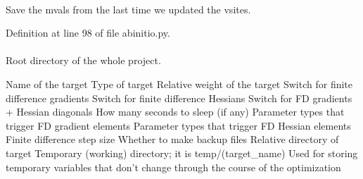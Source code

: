 \hypertarget{classforcebalance_1_1abinitio_1_1AbInitio_a430661954fff8c1979eb9ac28523bb5e}{
\paragraph[{save\-\_\-vmvals}]{}}\label{classforcebalance_1_1abinitio_1_1AbInitio_a430661954fff8c1979eb9ac28523bb5e}


\-Save the mvals from the last time we updated the vsites. 



\-Definition at line 98 of file abinitio.\-py.

\hypertarget{classforcebalance_1_1target_1_1Target_aede2856573b890cd47054ad36937d6f6}{
\paragraph[{tempdir}]{}}\label{classforcebalance_1_1target_1_1Target_aede2856573b890cd47054ad36937d6f6}


\-Root directory of the whole project. 

\-Name of the target \-Type of target \-Relative weight of the target \-Switch for finite difference gradients \-Switch for finite difference \-Hessians \-Switch for \-F\-D gradients + \-Hessian diagonals \-How many seconds to sleep (if any) \-Parameter types that trigger \-F\-D gradient elements \-Parameter types that trigger \-F\-D \-Hessian elements \-Finite difference step size \-Whether to make backup files \-Relative directory of target \-Temporary (working) directory; it is temp/(target\-\_\-name) \-Used for storing temporary variables that don't change through the course of the optimization 


